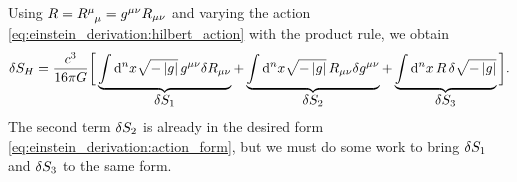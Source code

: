 Using $R = R\indices{^\mu_\mu} = g^{\mu \nu} R_{\mu \nu}$ and varying the action \eqref{eq:einstein_derivation:hilbert_action} with the product rule, we obtain
\begin{equation}
	\delta S_H = \frac{c^3}{16 \pi G} \bigg[
	                  \underbrace{\int \mathop{}\!\mathrm{d}^n x \sqrt{-\left\lvert g \right\rvert} \, g^{\mu \nu} \delta R_{\mu \nu}}_{\textstyle \delta S_1}
	                + \underbrace{\int \mathop{}\!\mathrm{d}^n x \sqrt{-\left\lvert g \right\rvert} \, R_{\mu \nu} \delta g^{\mu \nu}}_{\textstyle \delta S_2}
	                + \underbrace{\int \mathop{}\!\mathrm{d}^n x \, R \, \delta \sqrt{-\left\lvert g \right\rvert}                      }_{\textstyle \delta S_3}
					\bigg] .
	\label{eq:einstein_derivation:ds_split}
\end{equation}
The second term $\delta S_2$ is already in the desired form \eqref{eq:einstein_derivation:action_form}, but we must do some work to bring $\delta S_1$ and $\delta S_3$ to the same form.


